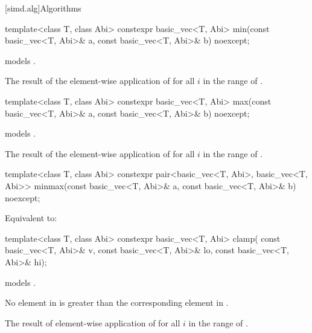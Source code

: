 [simd.alg]{Algorithms}

\begin{itemdecl}
template<class T, class Abi>
  constexpr basic_vec<T, Abi> min(const basic_vec<T, Abi>& a,
                                  const basic_vec<T, Abi>& b) noexcept;
\end{itemdecl}

\begin{itemdescr}
\pnum
\constraints
{} models .

\pnum
\returns
The result of the element-wise application of  for
all $i$ in the range of .
\end{itemdescr}

\begin{itemdecl}
template<class T, class Abi>
  constexpr basic_vec<T, Abi> max(const basic_vec<T, Abi>& a,
                                  const basic_vec<T, Abi>& b) noexcept;
\end{itemdecl}

\begin{itemdescr}
\pnum
\constraints
{} models .

\pnum
\returns
The result of the element-wise application of  for
all $i$ in the range of .
\end{itemdescr}

\begin{itemdecl}
template<class T, class Abi>
  constexpr pair<basic_vec<T, Abi>, basic_vec<T, Abi>>
    minmax(const basic_vec<T, Abi>& a, const basic_vec<T, Abi>& b) noexcept;
\end{itemdecl}

\begin{itemdescr}
\pnum
\effects
Equivalent to: 
\end{itemdescr}

\begin{itemdecl}
template<class T, class Abi>
  constexpr basic_vec<T, Abi> clamp(
    const basic_vec<T, Abi>& v, const basic_vec<T, Abi>& lo, const basic_vec<T, Abi>& hi);
\end{itemdecl}

\begin{itemdescr}
\pnum
\constraints
{} models .

\pnum
\expects
No element in  is greater than the corresponding element in
.

\pnum
\returns
The result of element-wise application of  for all $i$ in the range of .
\end{itemdescr}

